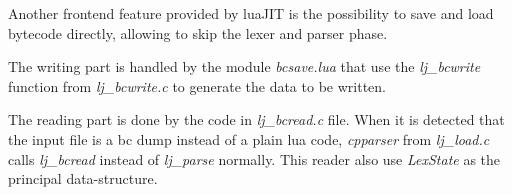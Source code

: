 Another frontend feature provided by luaJIT is the possibility to save and load
bytecode directly, allowing to skip the lexer and parser phase.

The writing part is handled by the module \emph{bcsave.lua} that use the
\emph{lj\_bcwrite} function from \emph{lj\_bcwrite.c} to generate the data to be written.

The reading part is done by the code in \emph{lj\_bcread.c} file. When it is
detected that the input file is a bc dump instead of a plain lua code,
\emph{cpparser} from \emph{lj\_load.c} calls \emph{lj\_bcread} instead of
\emph{lj\_parse} normally. This reader also use \emph{LexState} as the principal
data-structure.

